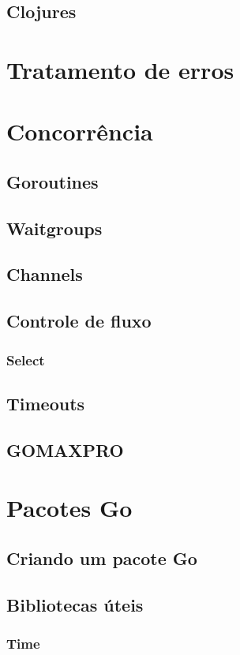 \documentclass{SBCbookchapter}
\begin{document}
\subsection{Clojures}

\section{Tratamento de erros}

\section{Concorrência}
\subsection{Goroutines}
\subsection{Waitgroups}
\subsection{Channels}
\subsection{Controle de fluxo}
\subsubsection{Select}
\subsection{Timeouts}
\subsection{GOMAXPRO}

\section{Pacotes Go}
\subsection{Criando um pacote Go}
\subsection{Bibliotecas úteis}
\subsubsection{Time}
\end{document}
